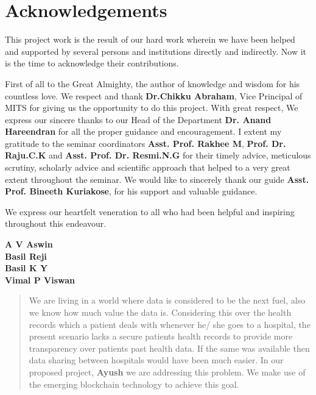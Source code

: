 \documentclass[11pt]{report}
\begin{document}
\newpage

\thispagestyle{empty}


\section*{\centering Acknowledgements}
\par This project work is the result of our hard work wherein we have been helped and supported by several persons and institutions directly and indirectly. Now it is the time to acknowledge their contributions. 

\par First of all to the Great Almighty, the author of knowledge and wisdom for his countless love. We respect and thank \textbf{Dr.Chikku Abraham}, Vice Principal of MITS for giving us the opportunity to do this project.
With great respect, We express our sincere thanks to our Head of the Department \textbf{Dr. Anand Hareendran} for all the proper guidance and encouragement. I extent my gratitude to the seminar coordinators \textbf{Asst. Prof. Rakhee M}, \textbf{Prof. Dr. Raju.C.K} and \textbf{Asst. Prof. Dr.  Resmi.N.G} for their timely advice, meticulous scrutiny, scholarly advice and scientific approach that helped to a very great extent throughout the seminar. We would like to sincerely thank our guide \textbf{Asst. Prof. Bineeth Kuriakose}, for his support and valuable guidance.

\par We express our heartfelt veneration to all who had been helpful and inspiring throughout this endeavour.
\newline

\noindent\textbf{A V Aswin \\
Basil Reji \\
Basil K Y  \\
Vimal P Viswan}



\newpage
\vspace{2cm}


\begin{abstract}
We are living in a world where data is considered to be the next fuel, also we know how much value the data is. Considering this over the health records which a patient deals with whenever he/ she goes to a hospital, the present scenario lacks a secure  patients health
records to provide more transparency over patients past health data. If the same was available then data sharing between hospitals would have been much easier. In our proposed project, \textbf{Ayush} we are
addressing this problem. We make use of the emerging blockchain technology to achieve this goal.   
\end{abstract}
 
\end{document}
